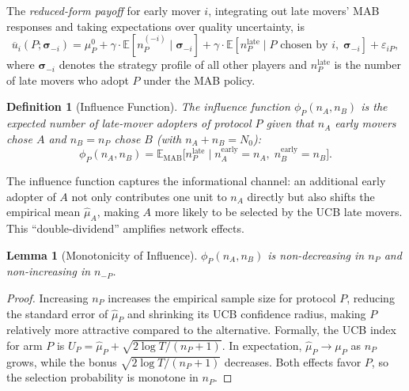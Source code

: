 \documentclass[12pt,a4paper]{article}
\newtheorem{lemma}[theorem]{Lemma}
\newtheorem{definition}[theorem]{Definition}
\newcommand{\E}{\mathbb{E}}
\begin{document}
\medskip\noindent
The \emph{reduced-form payoff} for early mover $i$, integrating out late
movers' MAB responses and taking expectations over quality uncertainty, is
\begin{equation}\label{eq:reduced-payoff}
    \overline{u}_i(P; \boldsymbol{\sigma}_{-i}) =
    \mu_P^0
    + \gamma\cdot\E[n_P^{(-i)}\mid\boldsymbol{\sigma}_{-i}]
    + \gamma\cdot\E[n_P^{\text{late}}\mid P\text{ chosen by }i,\;
                     \boldsymbol{\sigma}_{-i}]
    + \varepsilon_{iP},
\end{equation}
where $\boldsymbol{\sigma}_{-i}$ denotes the strategy profile of all other
players and $n_P^{\text{late}}$ is the number of late movers who adopt $P$
under the MAB policy.

\begin{definition}[Influence Function]
\label{def:influence}
The \emph{influence function} $\phi_P(n_A,n_B)$ is the expected number of
late-mover adopters of protocol $P$ given that $n_A$ early movers chose $A$
and $n_B=n_P$ chose $B$ (with $n_A+n_B=N_0$):
\begin{equation}\label{eq:influence}
    \phi_P(n_A,n_B) = \E_{\text{MAB}}\!\big[n_P^{\text{late}} \mid
    n_A^{\text{early}}=n_A,\; n_B^{\text{early}}=n_B\big].
\end{equation}
\end{definition}

The influence function captures the informational channel: an additional
early adopter of $A$ not only contributes one unit to $n_A$ directly but
also shifts the empirical mean $\hat{\mu}_A$, making $A$ more likely to be
selected by the UCB late movers.  This ``double-dividend'' amplifies
network effects.

\begin{lemma}[Monotonicity of Influence]
\label{lem:influence-monotone}
$\phi_P(n_A,n_B)$ is non-decreasing in $n_P$ and non-increasing in
$n_{-P}$.
\end{lemma}

\begin{proof}
Increasing $n_P$ increases the empirical sample size for protocol $P$,
reducing the standard error of $\hat{\mu}_P$ and shrinking its UCB
confidence radius, making $P$ relatively more attractive compared to the
alternative.  Formally, the UCB index for arm $P$ is
$U_P = \hat{\mu}_P + \sqrt{2\log T/(n_P+1)}$.
In expectation, $\hat{\mu}_P\to\mu_P$ as $n_P$ grows, while the bonus
$\sqrt{2\log T/(n_P+1)}$ decreases.  Both effects favor $P$, so the
selection probability is monotone in $n_P$.
\end{proof}
\end{document}
